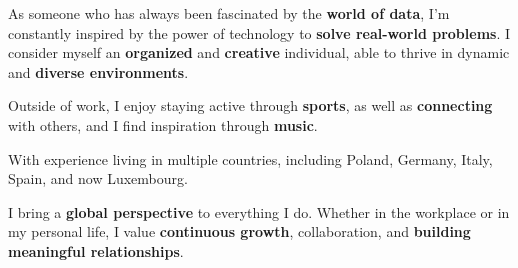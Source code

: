 

\begin{cvparagraph}

As someone who has always been fascinated by the \textbf{world of data}, I’m constantly inspired by the power of technology to\textbf{ solve real-world problems}. I consider myself an \textbf{organized} and \textbf{creative} individual, able to thrive in dynamic and \textbf{diverse environments}. 

Outside of work, I enjoy staying active through \textbf{sports}, as well as \textbf{connecting} with others, and I find inspiration through \textbf{music}.

With experience living in multiple countries, including Poland, Germany, Italy, Spain, and now Luxembourg.

I bring a \textbf{global perspective} to everything I do. Whether in the workplace or in my personal life, I value \textbf{continuous growth}, collaboration, and \textbf{building meaningful relationships}.
\end{cvparagraph}
